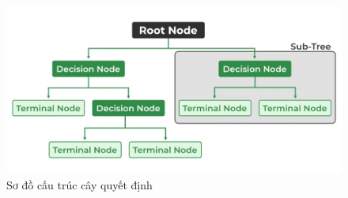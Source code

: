 \documentclass[a4paper]{article}
\begin{document}
\begin{figure}
    \centering
    \includegraphics[width=0.9\linewidth]{images/decisiontree.png}
    \caption{Sơ đồ cấu trúc cây quyết định\cite{geeksforgeeks_decision_tree}}
    \label{fig:decisiontree}
\end{figure}
\end{document}
